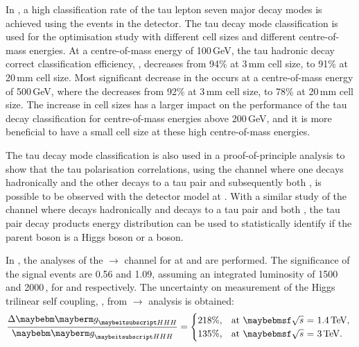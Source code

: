 
In , a high classification rate of the tau lepton seven major decay modes is achieved using the \eeTauTau events in the \ILD detector. The tau decay mode classification is used for the \ECAL optimisation study with different \ECAL cell sizes and different centre-of-mass energies. At a centre-of-mass energy of 100\,GeV, the tau hadronic decay correct classification efficiency, \tauHad, decreases from 94\% at 3\,mm \ECAL cell size, to 91\% at 20\,mm cell size. Most significant decrease in the \tauHad occurs at  a centre-of-mass energy of 500\,GeV, where the \tauHad decreases from 92\% at 3\,mm cell size, to 78\% at 20\,mm cell size. The increase in \ECAL cell sizes has a larger impact on the performance of the tau decay classification for centre-of-mass energies above 200\,GeV, and it is more beneficial to have a small \ECAL cell size at these high centre-of-mass energies.

The tau decay mode classification is also used in a proof-of-principle analysis to show that the tau polarisation correlations, using the \eeZZ channel where one \PZ decays hadronically and the other \PZ decays to a tau pair and subsequently both \tauToPion,  is possible to be observed with the \ILD detector model at . With a similar study of the \eeHZ channel where \PH decays hadronically and \PZ decays to a tau pair and both \tauToPion,  the  tau pair decay products energy distribution can be used to statistically identify if the parent boson is a Higgs boson or a \PZ boson.




 In , the analyses of the \eeToHH $\to$ \HepProcess{ \Pbottom \APbottom \PWplus \PWminus \Pnue \APnue} channel for \CLIC at  and  are performed. The significance of the signal events are 0.56 and 1.09,  assuming an integrated luminosity of 1500\, and 2000\,, for   and  respectively.  The uncertainty on measurement of the Higgs trilinear self coupling, \gHHH, from  \eeToHH $\to$ \HepProcess{ \Pbottom \APbottom \PWplus \PWminus \Pnue \APnue} analysis is obtained:
\begin{equation}
\frac{\Delta\gHHH}{\gHHH}=
\begin{cases}
  218\%, & \mbox{at \rootS{1.4}, }  \\
  135\%, & \mbox{at \rootS{3}}.
\end{cases}
\end{equation}


